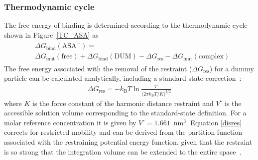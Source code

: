 \subsubsection{Thermodynamic cycle}
The free energy of binding is determined according to the thermodynamic cycle shown in Figure~\ref{TC_ASA} as
\begin{align}\begin{split}
& \Delta G_{\text{bind}}(\text{ASA}^-)= \\ 
& \Delta G_{\text{mut}}(\text{free})+\Delta G_{\text{bind}}(\text{DUM})-\Delta G_{\text{res}}-\Delta G_{\text{mut}}(\text{complex})
\end{split}\end{align}
%
The free energy associated with the removal of the restraint ($\Delta G_{\text{res}}$) for a dummy particle can be calculated analytically, including a standard state correction~\cite{Roux, Boresch}: 
\begin{align} \label{disres}
    \Delta G_{\text{res}} = -k_{\text{B}}T \ln\frac{V^{\circ}}{\Big(2\pi k_{\text{B}}T/K\Big)^{3/2}}
\end{align}
where $K$ is the force constant of the harmonic distance restraint and $V^{\circ}$ is the accessible solution volume corresponding to the standard-state definition. For a molar reference concentration it is given by $V^{\circ}=1.661$~nm$^3$.
Equation \ref{disres} corrects for restricted mobility and can be derived from the partition function associated with the restraining potential energy function, 
given that the restraint is so strong that the integration volume can be extended to the entire space~\cite{Gebhardt2016}.


